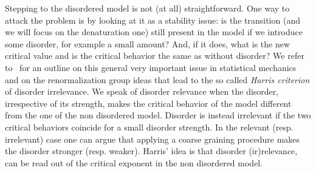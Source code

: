 \documentclass[AHL,Unicode,longabstracts]{cedram}
\begin{document}
Stepping to the disordered model is not (at all) straightforward. One way to attack the problem is by looking at it as a stability issue: is the transition (and we will focus on the denaturation one) still present in the model if we introduce some disorder, for example a small amount? And, if it does, what is the new critical value and is the critical behavior the same as without disorder? We refer to~\cite[Chapter~5]{cf:GB} for an outline on this general very important issue in statistical mechanics and on the renormalization group ideas that lead to the so called \emph{Harris criterion} of disorder irrelevance. We speak of disorder relevance when the disorder, irrespective of its strength, makes the critical behavior of the model different from the one of the non disordered model. Disorder is instead irrelevant if the two critical behaviors coincide for a small disorder strength. In the relevant (resp. irrelevant) case one can argue that applying a coarse graining procedure makes the disorder stronger (resp. weaker). Harris' idea is that disorder (ir)relevance, can be read out of the critical exponent in the non disordered model.
\end{document}
